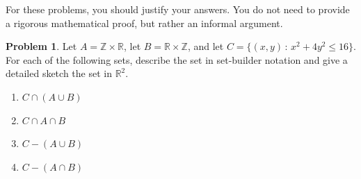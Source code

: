 \documentclass[12pt]{amsart}
\newcounter{problem_number}[section]
\theoremstyle{named}
\theoremstyle{definition}
\newtheorem{problem}{Problem}
\newcommand{\R}{\mathbb R}
\newcommand{\Z}{\mathbb Z}
\begin{document}
For these problems, you should justify your answers. You do not need to provide a rigorous mathematical proof, but rather an informal argument.

\begin{problem}
	Let $A = \Z\times\R$, let $B = \R\times\Z$, and let $C = \{(x,y)\,:\, x^2+4y^2\leq 16\}$.
	For each of the following sets, describe the set in set-builder notation and give a detailed sketch the set in $\R^2$.
	\begin{enumerate}
		\item $C\cap (A\cup B)$
		\item $C\cap A\cap B$
		\item $C - (A\cup B)$
		\item $C - (A\cap B)$
	\end{enumerate}
\end{problem}
\end{document}
